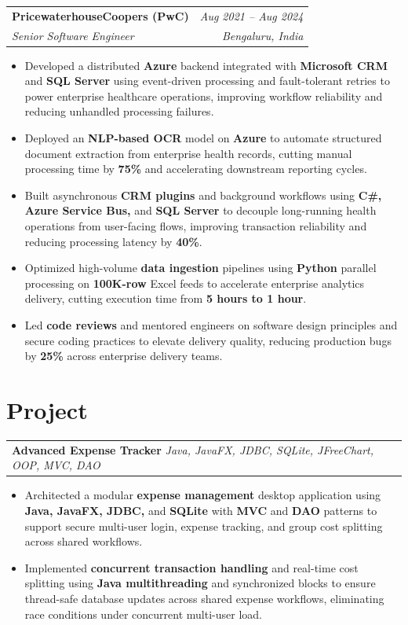 \documentclass[letterpaper,10pt]{article}
\makeatletter
\newcommand{\resumeSubheading}[4]{
  \vspace{3pt}
  \begin{tabular*}{\textwidth}{@{}l@{\extracolsep{\fill}}r@{}}
    \textbf{#1} & \textit{#4} \\
    \textit{#3} & \textit{#2} \\
  \end{tabular*}\vspace{0pt}
}
\newcommand{\resumeProject}[3]{
  \vspace{2pt}
  \begin{tabular*}{\textwidth}{@{}l@{\extracolsep{\fill}}r@{}}
    \textbf{#1} \textbar{} \textit{#2} & #3 \\
  \end{tabular*}\vspace{-2pt}
}
\newcommand{\resumeItemListStart}{\begin{itemize}[leftmargin=12pt, itemsep=0.9pt, topsep=1.5pt, parsep=0pt]}
\newcommand{\resumeItemListEnd}{\end{itemize}\vspace{-1pt}}
\makeatother
\begin{document}
\resumeSubheading
{PricewaterhouseCoopers (PwC)}{Bengaluru, India}
{Senior Software Engineer}{Aug 2021 -- Aug 2024}
\resumeItemListStart
  \item \footnotesize{Developed a distributed \textbf{Azure} backend integrated with \textbf{Microsoft CRM} and \textbf{SQL Server} using event-driven processing and fault-tolerant retries to power enterprise healthcare operations, improving workflow reliability and reducing unhandled processing failures.}
  \item \footnotesize{Deployed an \textbf{NLP-based OCR} model on \textbf{Azure} to automate structured document extraction from enterprise health records, cutting manual processing time by \textbf{75\%} and accelerating downstream reporting cycles.}
  \item \footnotesize{Built asynchronous \textbf{CRM plugins} and background workflows using \textbf{C\#, Azure Service Bus,} and \textbf{SQL Server} to decouple long-running health operations from user-facing flows, improving transaction reliability and reducing processing latency by \textbf{40\%}.}
  \item \footnotesize{Optimized high-volume \textbf{data ingestion} pipelines using \textbf{Python} parallel processing on \textbf{100K-row} Excel feeds to accelerate enterprise analytics delivery, cutting execution time from \textbf{5 hours to 1 hour}.}
  \item \footnotesize{Led \textbf{code reviews} and mentored engineers on software design principles and secure coding practices to elevate delivery quality, reducing production bugs by \textbf{25\%} across enterprise delivery teams.}
\resumeItemListEnd

\section{Project}
\resumeProject
{Advanced Expense Tracker}{Java, JavaFX, JDBC, SQLite, JFreeChart, OOP, MVC, DAO}{}
\resumeItemListStart
  \item \footnotesize{Architected a modular \textbf{expense management} desktop application using \textbf{Java, JavaFX, JDBC,} and \textbf{SQLite} with \textbf{MVC} and \textbf{DAO} patterns to support secure multi-user login, expense tracking, and group cost splitting across shared workflows.}
  \item \footnotesize{Implemented \textbf{concurrent transaction handling} and real-time cost splitting using \textbf{Java multithreading} and synchronized blocks to ensure thread-safe database updates across shared expense workflows, eliminating race conditions under concurrent multi-user load.}
\resumeItemListEnd
\vspace{2pt}
\end{document}
